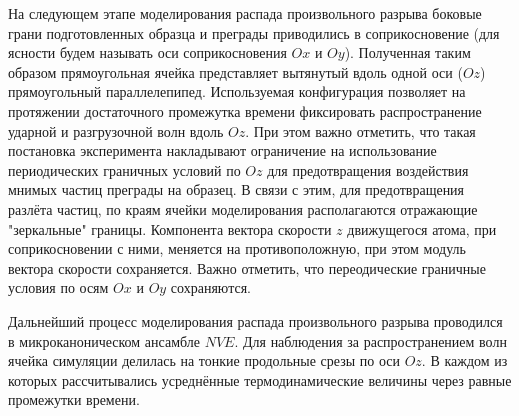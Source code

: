 На следующем этапе моделирования распада произвольного разрыва боковые грани подготовленных образца и преграды приводились в соприкосновение (для ясности будем называть оси соприкосновения $Ox$ и $Oy$). Полученная таким образом прямоугольная ячейка представляет вытянутый вдоль одной оси ($Oz$) прямоугольный параллелепипед. Используемая конфигурация позволяет на протяжении достаточного промежутка времени фиксировать распространение ударной и разгрузочной волн вдоль $Oz$. При этом важно отметить, что такая постановка эксперимента накладывают ограничение на использование периодических граничных условий по $Oz$ для предотвращения воздействия мнимых частиц преграды на образец. В связи с этим, для предотвращения разлёта частиц, по краям ячейки моделирования располагаются отражающие "зеркальные" границы. Компонента вектора скорости $z$ движущегося атома, при соприкосновении с ними, меняется на противоположную, при этом модуль вектора скорости сохраняется. Важно отметить, что переодические граничные условия по осям $Ox$ и $Oy$ сохраняются.

Дальнейший процесс моделирования распада произвольного разрыва проводился в микроканоническом ансамбле $NVE$. Для наблюдения за распространением волн ячейка симуляции делилась на тонкие продольные срезы по оси $Oz$. В каждом из которых рассчитывались усреднённые термодинамические величины через равные промежутки времени.  